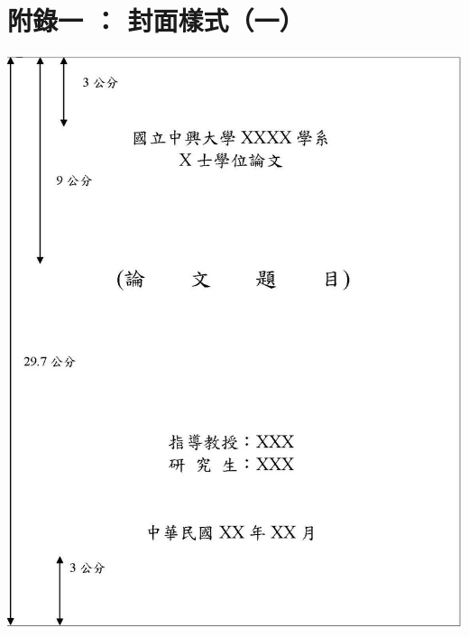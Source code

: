 \chapter{附錄一 ： 封面樣式（一）}
    \begin{center}
        \includegraphics[bb=0 0 1155 1460,width=\textwidth]{TitlePage1.jpg}
    \end{center}

